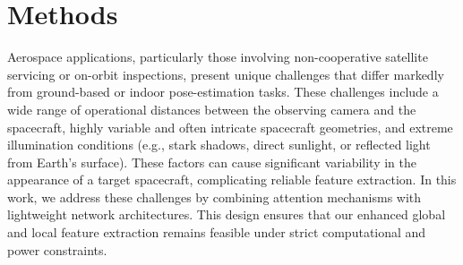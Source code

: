 \documentclass[a4paper,fleqn]{cas-sc}
\begin{document}
\section{Methods}\label{sec:method}
Aerospace applications, particularly those involving non-cooperative satellite servicing or on-orbit inspections, present unique challenges that differ markedly from ground-based or indoor pose-estimation tasks. These challenges include a wide range of operational distances between the observing camera and the spacecraft, highly variable and often intricate spacecraft geometries, and extreme illumination conditions (e.g., stark shadows, direct sunlight, or reflected light from Earth’s surface). These factors can cause significant variability in the appearance of a target spacecraft, complicating reliable feature extraction. In this work, we address these challenges by combining attention mechanisms with lightweight network architectures. This design ensures that our enhanced global and local feature extraction remains feasible under strict computational and power constraints.
\end{document}
